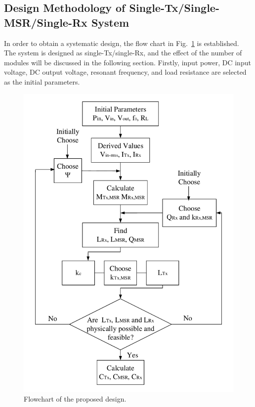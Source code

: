 \documentclass[journal]{IEEEtran}
\begin{document}
\subsection{Design Methodology of Single-Tx/Single-MSR/Single-Rx System}
In order to obtain a systematic design, the flow chart in Fig.~\ref{fig:flowchart} is established. 
The system is designed as single-Tx/single-Rx, and the effect of the number of modules will be discussed in the following section.  
Firstly, input power, DC input voltage, DC output voltage, resonant frequency, and load resistance are selected as the initial parameters. 
\begin{figure}[h!]
\centering\includegraphics[width=0.9\linewidth]{flow_chart.pdf}
\caption{Flowchart of the proposed design.}
\label{fig:flowchart}
\end{figure}
\end{document}
